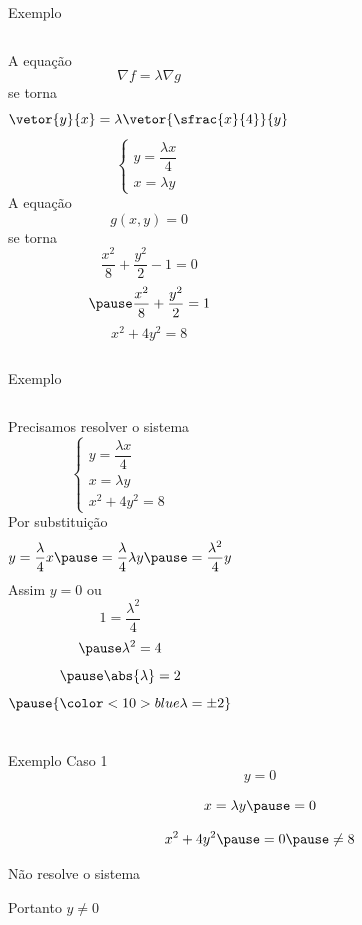 \begin{frame}[t]{Exemplo \theexemplo}
\begin{columns}
  A equação
  \[
    \nabla f = \lambda \nabla g
  \]
  \pause
  se torna
  \[
    \vetor{y}{x} = \lambda \vetor{\sfrac{x}{4}}{y}
  \]
  {%
  \pause
  \[
    \begin{cases}
      y = \dfrac{\lambda x}{4} \\[2mm]
      x = \lambda y
    \end{cases}
  \]}
  \pause
  A equação
  \[
    g(x, y) = 0
  \]
  \pause
  se torna
  \[
    \frac{x^2}{8} + \frac{y^2}{2} - 1 = 0
  \]
  \[
    \pause
    \frac{x^2}{8} + \frac{y^2}{2} = 1
  \]
  {%
  \pause
  \[
    x^2 + 4y^2 = 8
  \]}
\end{columns}
\end{frame}

\begin{frame}{Exemplo \theexemplo}
\begin{columns}
  Precisamos resolver o sistema
  \[
    \begin{cases}
      y = \dfrac{\lambda x}{4} \\
      x = \lambda y \\
      x^2 + 4y^2 = 8
    \end{cases}
  \]
  \pause
  Por substituição
  \[
    y = \dfrac{\lambda}{4} x
    \pause
    = \dfrac{\lambda}{4} \lambda y
    \pause
    = \dfrac{\lambda^2}{4} y
  \]
  \pause
  Assim {$y=0$}
  \pause
  ou
  \[
    1 = \dfrac{\lambda^2}{4}
  \]
  \[
    \pause
    \lambda^2 = 4
  \]
  \[
    \pause
    \abs{\lambda} = 2
  \]
  \[
    \pause
    {\color<10>{blue}\lambda = \pm 2}
  \]
\end{columns}
\end{frame}

\begin{frame}{Exemplo \theexemplo}
  Caso 1
  \[
    y = 0
  \]

  \pause
  \[
    x = \lambda y
    \pause
    = 0
  \]

  \pause
  \[
    x^2 + 4y^2
    \pause
    = 0
    \pause
    \neq 8
  \]

  \pause
  Não resolve o sistema

  \pause
  \vspace{\baselineskip}
  Portanto \(y\neq 0\)
\end{frame}

